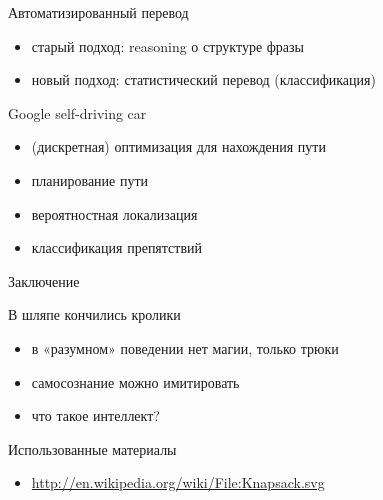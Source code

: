 \documentclass[10pt]{beamer}
\begin{document}
\begin{frame}{Автоматизированный перевод}
  \begin{itemize}
  \item старый подход: reasoning о структуре фразы
  \item новый подход: статистический перевод (классификация)
  \end{itemize}
\end{frame}

\begin{frame}{Google self-driving car}
  \begin{itemize}
  \item (дискретная) оптимизация для нахождения пути
  \item планирование пути
  \item вероятностная локализация
  \item классификация препятствий
  \end{itemize}
\end{frame}

\begin{frame}
  \Large
  Заключение
\end{frame}

\begin{frame}{В шляпе кончились кролики}
  \begin{itemize}
  \item в «разумном» поведении нет магии, только трюки
  \item самосознание можно имитировать
  \item что такое интеллект?
  \end{itemize}
\end{frame}

\begin{frame}{Использованные материалы}\label{lastframe}
  \footnotesize
  \begin{itemize}
  \item \url{http://en.wikipedia.org/wiki/File:Knapsack.svg}
  \end{itemize}
\end{frame}
\end{document}
